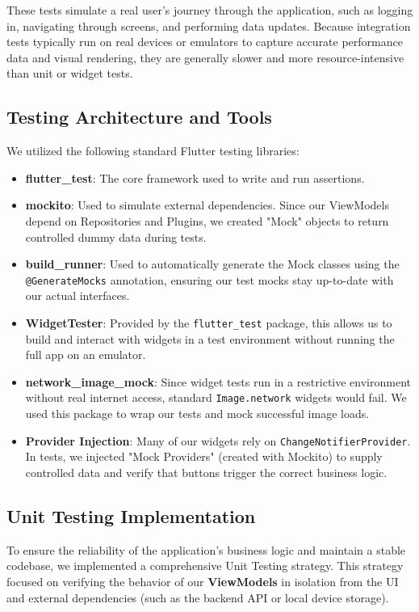 These tests simulate a real user's journey through the application, such as
logging in, navigating through screens, and performing data updates. Because
integration tests typically run on real devices or emulators to capture
accurate performance data and visual rendering, they are generally slower and
more resource-intensive than unit or widget tests.
\subsection{Testing Architecture and Tools}
We utilized the following standard Flutter testing libraries:
\begin{itemize}
    \item \textbf{flutter\_test}: The core framework used to write and run assertions.\cite{flutter_testing_docs}
    \item \textbf{mockito}: Used to simulate external dependencies. Since our ViewModels depend on Repositories and Plugins, we created "Mock" objects to return controlled dummy data during tests.\cite{mockito_pub}
    \item \textbf{build\_runner}: Used to automatically generate the Mock classes using the \texttt{@GenerateMocks} annotation, ensuring our test mocks stay up-to-date with our actual interfaces.\cite{build_runner_pub}
    \item \textbf{WidgetTester}: Provided by the \texttt{flutter\_test} package, this allows us to build and interact with widgets in a test environment without running the full app on an emulator.\cite{flutter_widgettester}
    \item \textbf{network\_image\_mock}: Since widget tests run in a restrictive environment without real internet access, standard \texttt{Image.network} widgets would fail. We used this package to wrap our tests and mock successful image loads.\cite{tigerasks2024provider, network_image_mock}
    \item \textbf{Provider Injection}: Many of our widgets rely on \newline\texttt{ChangeNotifierProvider}. In tests, we injected "Mock Providers" (created with Mockito) to supply controlled data and verify that buttons trigger the correct business logic.\cite{tigerasks2024provider}
\end{itemize}

\subsection{Unit Testing Implementation}
To ensure the reliability of the application's business logic and maintain a
stable codebase, we implemented a comprehensive Unit Testing strategy. This
strategy focused on verifying the behavior of our \textbf{ViewModels} in isolation from the UI and external dependencies (such as the
backend API or local device storage).

